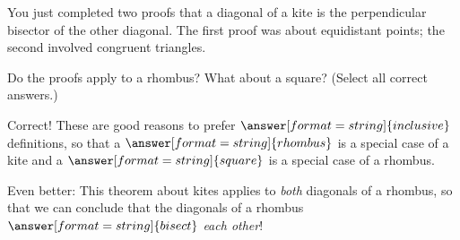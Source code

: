 \documentclass[nooutcomes]{ximera}
\begin{document}
\begin{problem}
You just completed two proofs that a diagonal of a kite is the perpendicular bisector of the other diagonal.  The first proof was about equidistant points; the second involved congruent triangles.  

Do the proofs apply to a rhombus? What about a square?  (Select all correct answers.)
\begin{selectAll}
\end{selectAll}
\begin{problem}
Correct!  These are good reasons to prefer $\answer[format=string]{inclusive}$ definitions, so that a $\answer[format=string]{rhombus}$ is a special case of a kite and a 
$\answer[format=string]{square}$ is a special case of a rhombus.  

Even better: This theorem about kites applies to \emph{both} diagonals of a rhombus, so that we can conclude that the diagonals of a rhombus 
$\answer[format=string]{bisect}$ \emph{each other}!  

\end{problem}
\end{problem}
\end{document}
